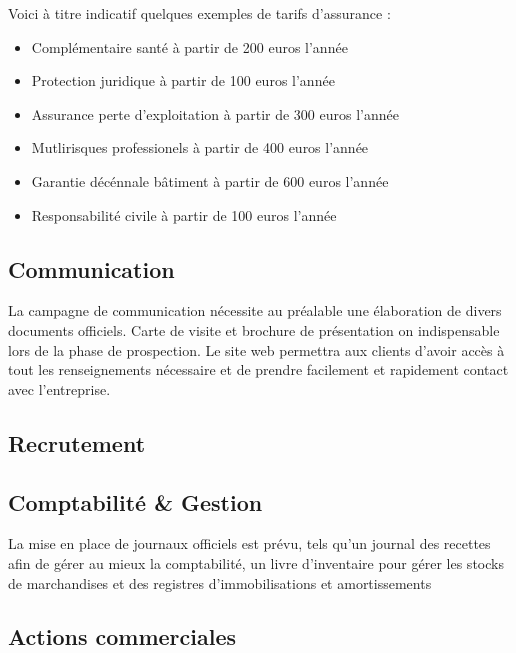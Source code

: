 \documentclass[10pt]{article}
\begin{document}
Voici à titre indicatif quelques exemples de tarifs d'assurance :
\begin{itemize}
	\item Complémentaire santé à partir de 200 euros l'année
	\item Protection juridique	à partir de 100 euros l'année
	\item Assurance perte d'exploitation à partir de 300 euros l'année
	\item Mutlirisques professionels à partir de 400 euros l'année
	\item Garantie décénnale bâtiment à partir de 600 euros l'année
	\item Responsabilité civile à partir de 100 euros l'année
\end{itemize} 



\subsection{Communication}
\label{sub:communication}
La campagne de communication nécessite au préalable une élaboration de divers documents officiels. Carte de visite et brochure de présentation on indispensable lors de la phase de prospection. Le site web permettra aux clients d'avoir accès à tout les renseignements nécessaire et de prendre facilement et rapidement contact avec l'entreprise.

\subsection{Recrutement}
\label{sub:recrutement}


\subsection{Comptabilité \& Gestion}
\label{sub:comptabilité_gestion}
La mise en place de journaux officiels est prévu, tels qu'un journal des recettes afin de gérer au mieux la comptabilité, un livre d'inventaire pour gérer les stocks de marchandises et des registres d'immobilisations et amortissements

\subsection{Actions commerciales}
\label{sub:actions_commerciales}
\end{document}
